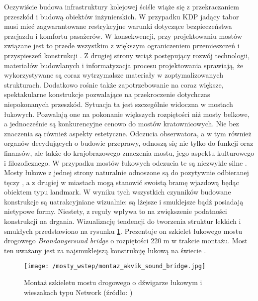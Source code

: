 Oczywiście budowa infrastruktury kolejowej ściśle wiąże się z przekraczaniem przeszkód i budową obiektów inżynierskich. W przypadku KDP jadący tabor musi mieć zagwarantowane restrykcyjne warunki dotyczące bezpieczeństwa przejazdu i komfortu pasażerów. W konsekwencji, przy projektowaniu mostów związane jest to przede wszystkim z większym ograniczeniem przemieszczeń i przyspieszeń konstrukcji \parencite{Niemierko2012}. Z drugiej strony wciąż postępujący rozwój technologii, materiałów budowlanych i informatyzacja procesu projektowania sprawiają, że wykorzystywane są coraz wytrzymalsze materiały w zoptymalizowanych strukturach. Dodatkowo rośnie także zapotrzebowanie na coraz większe, spektakularne konstrukcje pozwalające na przekroczenie dotychczas niepokonanych przeszkód. Sytuacja ta jest szczególnie widoczna w mostach łukowych. Pozwalają one na pokonanie większych rozpiętości niż mosty belkowe, a jednocześnie są konkurencyjne cenowo do mostów kratownicowych. Nie bez znaczenia są również aspekty estetyczne. Odczucia obserwatora, a w tym również organów decydujących o budowie przeprawy, odnoszą się nie tylko do funkcji oraz finansów, ale także do krajobrazowego znaczenia mostu, jego aspektu kulturowego i filozoficznego. W przypadku mostów łukowych odczucia te są niezwykle silne \parencite{Kido_Cywiński_2019,Kido_Cywiński_2021}. Mosty łukowe z jednej strony naturalnie odnoszone są do pozytywnie odbieranej tęczy \parencite{Prandowski1994}, a z drugiej w miastach mogą stanowić swoistą bramę wjazdową będąc obiektem typu landmark. W wyniku tych wszystkich czynników budowane konstrukcje są uatrakcyjniane wizualnie: są lżejsze i smuklejsze bądź posiadają nietypowe formy. Niestety, z reguły wpływa to na zwiększenie podatności konstrukcji na drgania. Wizualizację tendencji do tworzenia struktur lekkich i smukłych przedstawiono na rysunku \ref{fig:bridges_arch_monatage}. Prezentuje on szkielet łukowego mostu drogowego \textit{Brandangersund bridge} o rozpiętości 220 m w trakcie montażu. Most ten uważany jest za najsmuklejszą konstrukcję łukową na świecie \parencite{Larssen2011}.

\begin{figure}[hbt!]
	\centering
	\texttt{[image: /mosty\_wstep/montaz\_akvik\_sound\_bridge.jpg]}
	\captionsetup{justification=centering}
	\caption{Montaż szkieletu mostu drogowego o dźwigarze łukowym i wieszakach typu Network (źródło: \parencite{Tveit2014})}
	\label{fig:bridges_arch_monatage}
\end{figure}

